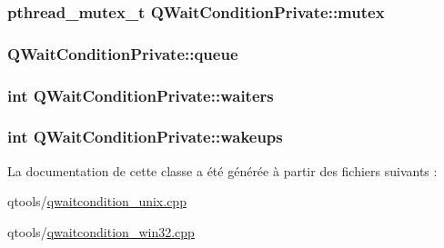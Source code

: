 \subsubsection[{mutex}]{\setlength{\rightskip}{0pt plus 5cm}pthread\+\_\+mutex\+\_\+t Q\+Wait\+Condition\+Private\+::mutex}\label{class_q_wait_condition_private_a361375d2df4f05c0dddfc1f95832a73b}
\hypertarget{class_q_wait_condition_private_ab312b34eeb97bd25d20b86b9fff1de16}{}
\subsubsection[{queue}]{ Q\+Wait\+Condition\+Private\+::queue}\label{class_q_wait_condition_private_ab312b34eeb97bd25d20b86b9fff1de16}
\hypertarget{class_q_wait_condition_private_ae4a4fc8e92470eb0a2032dd9a1cd0c92}{}
\subsubsection[{waiters}]{\setlength{\rightskip}{0pt plus 5cm}int Q\+Wait\+Condition\+Private\+::waiters}\label{class_q_wait_condition_private_ae4a4fc8e92470eb0a2032dd9a1cd0c92}
\hypertarget{class_q_wait_condition_private_aa89133c3205f41565f70014242dbb6ba}{}
\subsubsection[{wakeups}]{\setlength{\rightskip}{0pt plus 5cm}int Q\+Wait\+Condition\+Private\+::wakeups}\label{class_q_wait_condition_private_aa89133c3205f41565f70014242dbb6ba}


La documentation de cette classe a été générée à partir des fichiers suivants \+:\begin{DoxyCompactItemize}
\item 
qtools/\hyperlink{qwaitcondition__unix_8cpp}{qwaitcondition\+\_\+unix.\+cpp}\item 
qtools/\hyperlink{qwaitcondition__win32_8cpp}{qwaitcondition\+\_\+win32.\+cpp}\end{DoxyCompactItemize}
